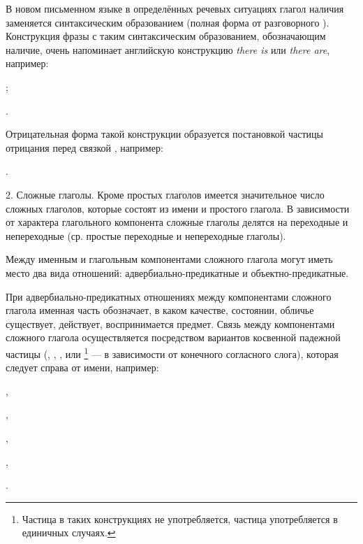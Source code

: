 В новом письменном языке в определённых речевых ситуациях глагол наличия  заменяется синтаксическим образованием  (полная форма от разговорного ). Конструкция фразы с таким синтаксическим образованием, обозначающим наличие, очень напоминает английскую конструкцию \emph{there is} или \emph{there are}, например:
\begin{prfsample}
	\item {};
	\item {}.
\end{prfsample}
Отрицательная форма такой конструкции образуется постановкой частицы отрицания перед связкой , например:
\begin{prfsample}
	\item {}.
\end{prfsample}

2. Сложные глаголы. Кроме простых глаголов имеется значительное число сложных глаголов, которые состоят из имени и простого глагола. В зависимости от характера глагольного компонента сложные глаголы делятся на переходные и непереходные (ср. простые переходные и непереходные глаголы).

Между именным и глагольным компонентами сложного глагола могут иметь место два вида отношений: адвербиально-предикатные и объектно-предикатные.

При адвербиально-предикатных отношениях между компонентами сложного глагола именная часть обозначает, в каком качестве, состоянии, обличье существует, действует, воспринимается предмет. Связь между компонентами сложного глагола осуществляется посредством вариантов косвенной падежной частицы (, , ,  или \footnote[35]{Частица  в таких конструкциях не употребляется, частица  употребляется в единичных случаях.} --- в зависимости от конечного согласного слога), которая следует справа от имени, например:
\begin{prfsample}
	\item {},
	\item {},
	\item {},
	\item {},
	\item {}.
\end{prfsample}

